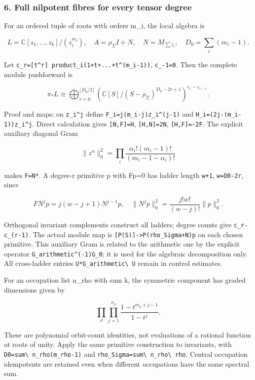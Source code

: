 \subsubsection{6. Full nilpotent fibres for every tensor
degree}\label{pr_17:full-nilpotent-fibres-for-every-tensor-degree}

For an ordered tuple of roots with orders m\_i, the local algebra is

\[L=\mathbb C[z_1,\ldots,z_k]/(z_i^{m_i}),\quad A=\rho_\Sigma I+N,\quad N=M_{\sum z_i},\quad D_0=\sum_i(m_i-1).\]

Let \texttt{c\_r={[}t\^{}r{]}\ product\_i(1+t+...+t\^{}(m\_i-1))}, \nolinkurl{c_-1=0}. Then the
complete module pushforward is

\[\boxed{\pi_*L\cong\bigoplus_{r=0}^{\lfloor D_0/2\rfloor}\left(\mathbb C[S]/(S-\rho_\Sigma)^{D_0-2r+1}\right)^{c_r-c_{r-1}}.}\]

Proof and maps: on \texttt{z\_i\^{}j} define \texttt{F\_i=j(m\_i-j)z\_i\^{}(j-1)} and
\texttt{H\_i=(2j-(m\_i-1))z\_i\^{}j}. Direct calculation gives \texttt{{[}N,F{]}=H},
\texttt{{[}H,N{]}=2N}, \texttt{{[}H,F{]}=-2F}. The explicit auxiliary diagonal Gram

\[\|z^\alpha\|_0^2=\prod_i\frac{\alpha_i!(m_i-1)!}{(m_i-1-\alpha_i)!}\]

makes \nolinkurl{F=N*}. A degree-r primitive p with Fp=0 has ladder length \nolinkurl{w+1},
\nolinkurl{w=D0-2r}, since

\[FN^jp=j(w-j+1)N^{j-1}p,\quad\|N^jp\|_0^2=\frac{j!w!}{(w-j)!}\|p\|_0^2.\]

Orthogonal invariant complements construct all ladders; degree counts give \nolinkurl{c_r-c_(r-1)}.
The actual module map is \texttt{{[}P(S){]}-\textgreater{}P(rho\_Sigma+N)p} on each chosen
primitive. This auxiliary Gram is related to the arithmetic one by the explicit operator
\texttt{G\_arithmetic\^{}(-1)G\_0}; it is used for the algebraic decomposition only. All
cross-ladder entries \nolinkurl{U*G_arithmetic\ U} remain in control estimates.

For an occupation list n\_rho with sum k, the symmetric component has graded dimensions given by

\[\prod_\rho\prod_{j=1}^{n_\rho}\frac{1-t^{m_\rho+j-1}}{1-t^j}.\]

These are polynomial orbit-count identities, not evaluations of a rational function at roots of
unity. Apply the same primitive construction to invariants, with \nolinkurl{D0=sum\ n_rho(m_rho-1)}
and \nolinkurl{rho_Sigma=sum\ n_rho\ rho}. Central occupation idempotents are retained even when
different occupations have the same spectral sum.

